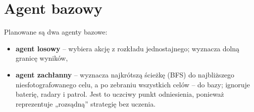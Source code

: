 \section{Agent bazowy}
\label{sec:baseline}

Planowane są dwa agenty bazowe:
\begin{itemize}
  \item \textbf{agent losowy} -- wybiera akcję z rozkładu jednostajnego;
        wyznacza dolną granicę wyników,
  \item \textbf{agent zachłanny} -- wyznacza najkrótszą ścieżkę (BFS) do
        najbliższego niesfotografowanego celu, a po zebraniu wszystkich celów
        -- do bazy; ignoruje baterię, radary i patrol. Jest to uczciwy
        punkt odniesienia, ponieważ reprezentuje „rozsądną'' strategię
        bez uczenia.
\end{itemize}

